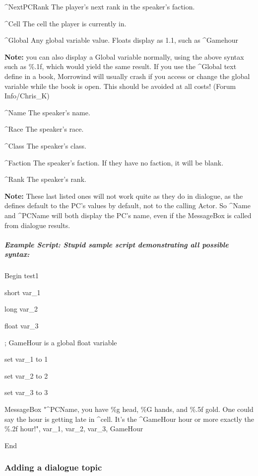 \documentclass[
]{article}
\begin{document}
\^{}NextPCRank The player's next rank in the speaker's faction.

\^{}Cell The cell the player is currently in.

\^{}Global Any global variable value. Floats display as 1.1, such as
\^{}Gamehour

\textbf{Note:} you can also display a Global variable normally, using
the above syntax such as \%.1f, which would yield the same result. If
you use the \^{}Global text define in a book, Morrowind will usually
crash if you access or change the global variable while the book is
open. This should be avoided at all costs! (Forum Info/Chris\_K)

\^{}Name The speaker's name.

\^{}Race The speaker's race.

\^{}Class The speaker's class.

\^{}Faction The speaker's faction. If they have no faction, it will be
blank.

\^{}Rank The speaker's rank.

\textbf{Note:} These last listed ones will not work quite as they do in
dialogue, as the defines default to the PC's values by default, not to
the calling Actor. So \^{}Name and \^{}PCName will both display the PC's
name, even if the MessageBox is called from dialogue results.

\hypertarget{example-script-stupid-sample-script-demonstrating-all-possible-syntax}{%
\subparagraph{Example Script: Stupid sample script demonstrating all
possible
syntax:}\label{example-script-stupid-sample-script-demonstrating-all-possible-syntax}}

Begin test1

short var\_1

long var\_2

float var\_3

; GameHour is a global float variable

set var\_1 to 1

set var\_2 to 2

set var\_3 to 3

MessageBox "\^{}PCName, you have \%g head, \%G hands, and \%.5f gold.
One could say the hour is getting late in \^{}cell. It's the
\^{}GameHour hour or more exactly the \%.2f hour!", var\_1, var\_2,
var\_3, GameHour

End

\hypertarget{adding-a-dialogue-topic}{%
\subsubsection{Adding a dialogue topic}\label{adding-a-dialogue-topic}}
\end{document}
